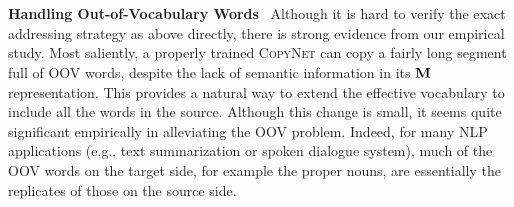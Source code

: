  \\
 \vspace{-7pt}\\
\textbf{Handling Out-of-Vocabulary Words}~
Although it is hard to verify the exact addressing strategy as above directly, there is strong evidence from our empirical study. Most saliently, a properly trained \textsc{CopyNet} can copy a fairly long segment full of OOV words, despite the lack of semantic information in its $\mathbf{M}$ representation. This provides a natural way to extend the effective vocabulary to include all the words in the source. Although this change is small, it seems quite significant empirically in alleviating the OOV problem. Indeed, for many NLP applications (e.g., text summarization or spoken dialogue system),  much of the OOV words on the target side, for example the proper nouns, are essentially the replicates of those on the source side.

